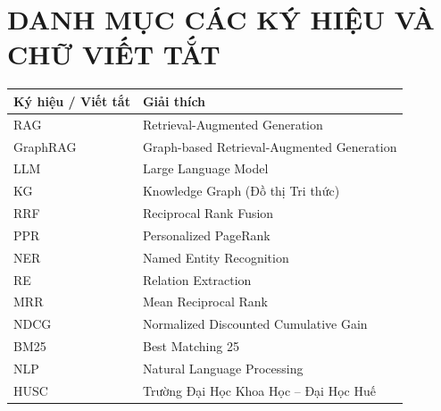 \documentclass[12pt,a4paper]{report}
\theoremstyle{plain}
\theoremstyle{definition}
\begin{document}
	\clearpage
	
	
	\tableofcontents
	\clearpage
	
	\listoffigures
	\clearpage
	
	\listoftables
	\clearpage
	
	
	\section*{DANH MỤC CÁC KÝ HIỆU VÀ CHỮ VIẾT TẮT}
	
	\begin{table}[h]
		\centering
		\begin{tabular}{ll}
			\toprule
			\textbf{Ký hiệu / Viết tắt} & \textbf{Giải thích}                        \\
			\midrule
			RAG                         & Retrieval-Augmented Generation             \\
			GraphRAG                    & Graph-based Retrieval-Augmented Generation \\
			LLM                         & Large Language Model                       \\
			KG                          & Knowledge Graph (Đồ thị Tri thức)          \\
			RRF                         & Reciprocal Rank Fusion                     \\
			PPR                         & Personalized PageRank                      \\
			NER                         & Named Entity Recognition                   \\
			RE                          & Relation Extraction                        \\
			MRR                         & Mean Reciprocal Rank                       \\
			NDCG                        & Normalized Discounted Cumulative Gain      \\
			BM25                        & Best Matching 25                           \\
			NLP                         & Natural Language Processing                \\
			HUSC                        & Trường Đại Học Khoa Học -- Đại Học Huế    \\
			\bottomrule
		\end{tabular}
	\end{table}
	
\end{document}
